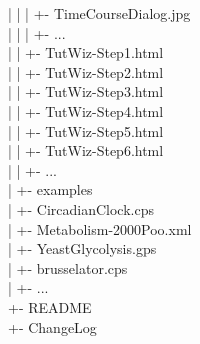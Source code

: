 \documentclass[12pt]{book}
\begin{document}
{\begin{tabbing}
 \> | \> \> | \> \> | \> +- TimeCourseDialog.jpg \\
 \> | \> \> | \> \> | \> +- ... \\
 \> | \> \> | \> \> +- TutWiz-Step1.html \\
 \> | \> \> | \> \> +- TutWiz-Step2.html \\
 \> | \> \> | \> \> +- TutWiz-Step3.html \\
 \> | \> \> | \> \> +- TutWiz-Step4.html \\
 \> | \> \> | \> \> +- TutWiz-Step5.html \\
 \> | \> \> | \> \> +- TutWiz-Step6.html \\
 \> | \> \> | \> \> +- ... \\
 \> | \> \> +- examples \\
 \> | \> \> \> +- CircadianClock.cps \\
 \> | \> \> \> +- Metabolism-2000Poo.xml \\
 \> | \> \> \> +- YeastGlycolysis.gps \\
 \> | \> \> \> +- brusselator.cps \\
 \> | \> \> \> +- ... \\
 \> +- README \\
 \> +- ChangeLog \\
\end{tabbing}
}
\end{document}
